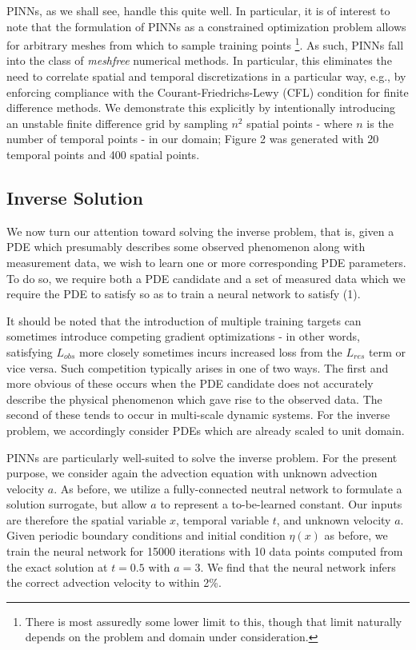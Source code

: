 \documentclass[letterpaper,11pt]{article}
\begin{document}
    PINNs, as we shall see, handle this quite well. In particular, it is of interest to note that the formulation of 
    PINNs as a constrained optimization problem allows for arbitrary meshes from which to sample training points 
    \footnote{
        There is most assuredly some lower limit to this, though that limit naturally depends on the problem and domain 
        under consideration.
    }. As such, PINNs fall into the class of \textit{meshfree} numerical methods. In particular, this eliminates
    the need to correlate spatial and temporal discretizations in a particular way, e.g., by enforcing compliance with
    the Courant-Friedrichs-Lewy (CFL) condition for finite difference methods. We demonstrate this explicitly by 
    intentionally introducing an unstable finite difference grid by sampling $n^2$ spatial points - where $n$ is the 
    number of temporal points - in our domain; Figure 2 was generated with 20 temporal points and 400 spatial points.


    \subsection*{Inverse Solution}
    We now turn our attention toward solving the inverse problem, that is, given a PDE which presumably describes some
    observed phenomenon along with measurement data, we wish to learn one or more corresponding PDE parameters. To do 
    so, we require both a PDE candidate and a set of measured data which we require the PDE to satisfy so as to train
    a neural network to satisfy (1).
    
    It should be noted that the introduction of multiple training targets can sometimes introduce competing gradient 
    optimizations - in other words, satisfying $L_{obs}$ more closely sometimes incurs increased loss from the $L_{res}$
    term or vice versa. Such competition typically arises in one of two ways. The first and more obvious of these occurs
    when the PDE candidate does not accurately describe the physical phenomenon which gave rise to the observed data.
    The second of these tends to occur in multi-scale dynamic systems.\cite{pino} For the inverse problem, we 
    accordingly consider PDEs which are already scaled to unit domain.

    PINNs are particularly well-suited to solve the inverse problem. For the present purpose, we consider again the
    advection equation with unknown advection velocity $a$. As before, we utilize a fully-connected neutral network to 
    formulate a solution surrogate, but allow $a$ to represent a to-be-learned constant. Our inputs are therefore the
    spatial variable $x$, temporal variable $t$, and unknown velocity $a$. Given periodic boundary conditions and 
    initial condition $\eta(x)$ as before, we train the neural network for 15000 iterations with 10 data points computed
    from the exact solution at $t = 0.5$ with $a = 3$. We find that the neural network infers the correct advection 
    velocity to within 2\%.
\end{document}
